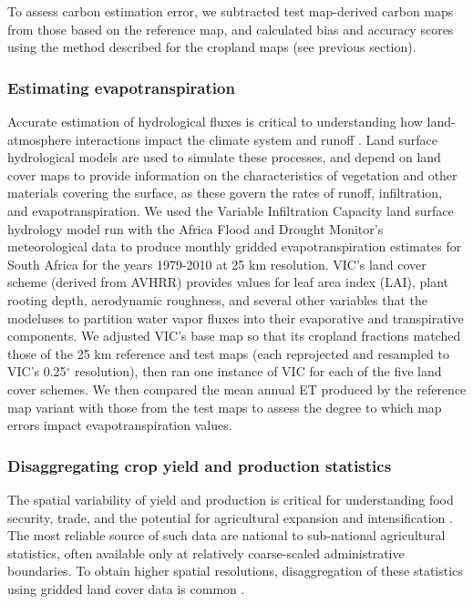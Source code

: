 \documentclass[a4paper]{article}
\begin{document}
To assess carbon estimation error, we subtracted test map-derived carbon maps from those based on the reference map, and calculated bias and accuracy scores using the method described for the cropland maps (see previous section). 

\vspace{-0.3 cm}
\subsubsection*{Estimating evapotranspiration}
\vspace{-0.2 cm}
Accurate estimation of hydrological fluxes is critical to understanding how land-atmosphere interactions impact the climate system and runoff \citep{liang_simple_1994}. Land surface hydrological models are used to simulate these processes, and depend on land cover maps to provide information on the characteristics of vegetation and other materials covering the surface, as these govern the rates of runoff, infiltration, and evapotranspiration. We used the Variable Infiltration Capacity \citep[VIC;][]{liang_simple_1994} land surface hydrology model run with the Africa Flood and Drought Monitor's meteorological data \citep{sheffield_drought_2013} to produce monthly gridded evapotranspiration estimates for South Africa for the years 1979-2010 at 25 km resolution. VIC's land cover scheme (derived from AVHRR) provides values for leaf area index (LAI), plant rooting depth, aerodynamic roughness, and several other variables that the modeluses to partition water vapor fluxes into their evaporative and transpirative components. We adjusted VIC's base map so that its cropland fractions matched those of the 25 km reference and test maps (each reprojected and resampled to VIC's 0.25$^{\circ}$ resolution), then ran one instance of VIC for each of the five land cover schemes. We then compared the mean annual ET produced by the reference map variant with those from the test maps to assess the degree to which map errors impact evapotranspiration values. 

\vspace{-0.3 cm}
\subsubsection*{Disaggregating crop yield and production statistics}
\vspace{-0.2 cm}
The spatial variability of yield and production is critical for understanding food security, trade, and the potential for agricultural expansion and intensification \citep{licker_mind_2010,monfreda_farming_2008}. The most reliable source of such data are national to sub-national agricultural statistics, often available only at relatively coarse-scaled administrative boundaries. To obtain higher spatial resolutions, disaggregation of these statistics using gridded land cover data is common \citep{ramankutty_farming_2008, monfreda_farming_2008,schierhorn_post-soviet_2013}. 
\end{document}
